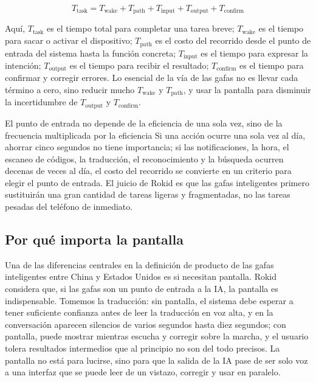 \documentclass[a4paper]{article}
\begin{document}
\[
T_{\text{task}} = T_{\text{wake}} + T_{\text{path}} + T_{\text{input}} + T_{\text{output}} + T_{\text{confirm}}
\]

Aquí, $T_{\text{task}}$ es el tiempo total para completar una tarea breve; $T_{\text{wake}}$ es el tiempo para sacar o activar el dispositivo; $T_{\text{path}}$ es el costo del recorrido desde el punto de entrada del sistema hasta la función concreta; $T_{\text{input}}$ es el tiempo para expresar la intención; $T_{\text{output}}$ es el tiempo para recibir el resultado; $T_{\text{confirm}}$ es el tiempo para confirmar y corregir errores. Lo esencial de la vía de las gafas no es llevar cada término a cero, sino reducir mucho $T_{\text{wake}}$ y $T_{\text{path}}$, y usar la pantalla para disminuir la incertidumbre de $T_{\text{output}}$ y $T_{\text{confirm}}$.

\begin{importantbox}{El punto de entrada no depende de la eficiencia de una sola vez, sino de la frecuencia multiplicada por la eficiencia}
Si una acción ocurre una sola vez al día, ahorrar cinco segundos no tiene importancia; si las notificaciones, la hora, el escaneo de códigos, la traducción, el reconocimiento y la búsqueda ocurren decenas de veces al día, el costo del recorrido se convierte en un criterio para elegir el punto de entrada. El juicio de Rokid es que las gafas inteligentes primero sustituirán una gran cantidad de tareas ligeras y fragmentadas, no las tareas pesadas del teléfono de inmediato.
\end{importantbox}

\subsection{Por qué importa la pantalla}

Una de las diferencias centrales en la definición de producto de las gafas inteligentes entre China y Estados Unidos es si necesitan pantalla. Rokid considera que, si las gafas son un punto de entrada a la IA, la pantalla es indispensable. Tomemos la traducción: sin pantalla, el sistema debe esperar a tener suficiente confianza antes de leer la traducción en voz alta, y en la conversación aparecen silencios de varios segundos hasta diez segundos; con pantalla, puede mostrar mientras escucha y corregir sobre la marcha, y el usuario tolera resultados intermedios que al principio no son del todo precisos. La pantalla no está para lucirse, sino para que la salida de la IA pase de ser solo voz a una interfaz que se puede leer de un vistazo, corregir y usar en paralelo.
\end{document}
